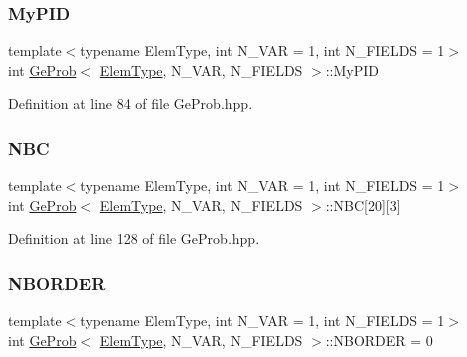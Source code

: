 \subsubsection{\texorpdfstring{My\+P\+ID}{MyPID}}
{\footnotesize\ttfamily template$<$typename Elem\+Type, int N\+\_\+\+V\+AR = 1, int N\+\_\+\+F\+I\+E\+L\+DS = 1$>$ \\
int \hyperlink{classGeProb}{Ge\+Prob}$<$ \hyperlink{spectral_8h_aaa2c1a7b2d1b12c590d730fe6ac839fa}{Elem\+Type}, N\+\_\+\+V\+AR, N\+\_\+\+F\+I\+E\+L\+DS $>$\+::My\+P\+ID\hspace{0.3cm}{\ttfamily [protected]}}



Definition at line 84 of file Ge\+Prob.\+hpp.

\mbox{\label{classGeProb_a5fb604ebcc5130a7ad4719d5f6578cb9}} 
\subsubsection{\texorpdfstring{N\+BC}{NBC}}
{\footnotesize\ttfamily template$<$typename Elem\+Type, int N\+\_\+\+V\+AR = 1, int N\+\_\+\+F\+I\+E\+L\+DS = 1$>$ \\
int \hyperlink{classGeProb}{Ge\+Prob}$<$ \hyperlink{spectral_8h_aaa2c1a7b2d1b12c590d730fe6ac839fa}{Elem\+Type}, N\+\_\+\+V\+AR, N\+\_\+\+F\+I\+E\+L\+DS $>$\+::N\+BC\mbox{[}20\mbox{]}\mbox{[}3\mbox{]}\hspace{0.3cm}{\ttfamily [protected]}}



Definition at line 128 of file Ge\+Prob.\+hpp.

\mbox{\label{classGeProb_a7ff7ce9c7e12c1bb099c41b7fdc91d7d}} 
\subsubsection{\texorpdfstring{N\+B\+O\+R\+D\+ER}{NBORDER}}
{\footnotesize\ttfamily template$<$typename Elem\+Type, int N\+\_\+\+V\+AR = 1, int N\+\_\+\+F\+I\+E\+L\+DS = 1$>$ \\
int \hyperlink{classGeProb}{Ge\+Prob}$<$ \hyperlink{spectral_8h_aaa2c1a7b2d1b12c590d730fe6ac839fa}{Elem\+Type}, N\+\_\+\+V\+AR, N\+\_\+\+F\+I\+E\+L\+DS $>$\+::N\+B\+O\+R\+D\+ER = 0\hspace{0.3cm}{\ttfamily [protected]}}



